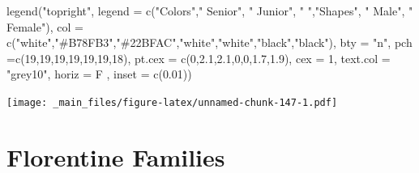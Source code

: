 \documentclass[
  notitlepage,
  onecolumn,
  openany]{book}
\newenvironment{Shaded}{\begin{snugshade}}{\end{snugshade}}
\newcommand{\AttributeTok}[1]{\textcolor[rgb]{0.77,0.63,0.00}{#1}}
\newcommand{\DecValTok}[1]{\textcolor[rgb]{0.00,0.00,0.81}{#1}}
\newcommand{\FloatTok}[1]{\textcolor[rgb]{0.00,0.00,0.81}{#1}}
\newcommand{\FunctionTok}[1]{\textcolor[rgb]{0.00,0.00,0.00}{#1}}
\newcommand{\NormalTok}[1]{#1}
\newcommand{\StringTok}[1]{\textcolor[rgb]{0.31,0.60,0.02}{#1}}
\begin{document}
\begin{Shaded}
\begin{Highlighting}[]
\FunctionTok{legend}\NormalTok{(}\StringTok{"topright"}\NormalTok{,}
       \AttributeTok{legend =} \FunctionTok{c}\NormalTok{(}\StringTok{"Colors"}\NormalTok{,}\StringTok{" Senior"}\NormalTok{, }\StringTok{" Junior"}\NormalTok{, }\StringTok{" "}\NormalTok{,}\StringTok{"Shapes"}\NormalTok{, }\StringTok{" Male"}\NormalTok{, }\StringTok{" Female"}\NormalTok{),}
       \AttributeTok{col =} \FunctionTok{c}\NormalTok{(}\StringTok{"white"}\NormalTok{,}\StringTok{"\#B78FB3"}\NormalTok{,}\StringTok{"\#22BFAC"}\NormalTok{,}\StringTok{"white"}\NormalTok{,}\StringTok{"white"}\NormalTok{,}\StringTok{"black"}\NormalTok{,}\StringTok{"black"}\NormalTok{), }
       \AttributeTok{bty =} \StringTok{"n"}\NormalTok{, }
       \AttributeTok{pch =}\FunctionTok{c}\NormalTok{(}\DecValTok{19}\NormalTok{,}\DecValTok{19}\NormalTok{,}\DecValTok{19}\NormalTok{,}\DecValTok{19}\NormalTok{,}\DecValTok{19}\NormalTok{,}\DecValTok{19}\NormalTok{,}\DecValTok{18}\NormalTok{),}
       \AttributeTok{pt.cex =} \FunctionTok{c}\NormalTok{(}\DecValTok{0}\NormalTok{,}\FloatTok{2.1}\NormalTok{,}\FloatTok{2.1}\NormalTok{,}\DecValTok{0}\NormalTok{,}\DecValTok{0}\NormalTok{,}\FloatTok{1.7}\NormalTok{,}\FloatTok{1.9}\NormalTok{), }
       \AttributeTok{cex =} \DecValTok{1}\NormalTok{, }
       \AttributeTok{text.col =} \StringTok{"grey10"}\NormalTok{, }
       \AttributeTok{horiz =}\NormalTok{ F , }
       \AttributeTok{inset =} \FunctionTok{c}\NormalTok{(}\FloatTok{0.01}\NormalTok{))}
\end{Highlighting}
\end{Shaded}

\texttt{[image: \_main\_files/figure-latex/unnamed-chunk-147-1.pdf]}

\hypertarget{florentine-families}{%
\section{Florentine Families}\label{florentine-families}}
\end{document}
